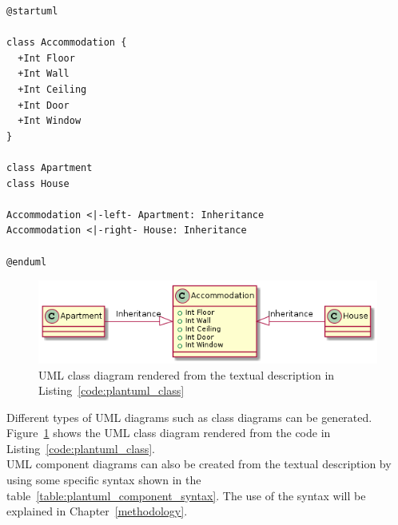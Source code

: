\begin{lstlisting}[caption=An example of textual description of a class diagram, label=code:plantuml_class]
@startuml

class Accommodation {
  +Int Floor
  +Int Wall
  +Int Ceiling
  +Int Door
  +Int Window
}

class Apartment
class House

Accommodation <|-left- Apartment: Inheritance
Accommodation <|-right- House: Inheritance

@enduml
\end{lstlisting}

\begin{figure}[H]
\centering
\captionsetup{justification=centering}
\vspace{0cm}%
\includegraphics[width=0.7\linewidth]{figure/misc/plantuml_class.png}
\caption{UML class diagram rendered from the textual description in Listing~\ref{code:plantuml_class}}
\label{fig:plantuml_class}
\end{figure}

Different types of UML diagrams such as class diagrams can be generated. Figure~\ref{fig:plantuml_class} shows the UML class diagram rendered from the code in Listing~\ref{code:plantuml_class}.\\

UML component diagrams can also be created from the textual description by using some specific syntax shown in the table~\ref{table:plantuml_component_syntax}. The use of the syntax will be explained in Chapter~\ref{methodology}. 

